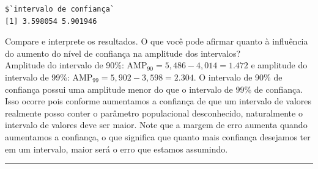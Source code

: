 \documentclass[a4paper,11pt,fleqn]{article}\usepackage[]{graphicx}\usepackage[]{color}
\makeatletter
\newenvironment{kframe}{%
 \def\at@end@of@kframe{}%
 \ifinner\ifhmode%
  \def\at@end@of@kframe{\end{minipage}}%
  \begin{minipage}{\columnwidth}%
 \fi\fi%
 \def\FrameCommand##1{\hskip\@totalleftmargin \hskip-\fboxsep
 \colorbox{shadecolor}{##1}\hskip-\fboxsep
     \hskip-\linewidth \hskip-\@totalleftmargin \hskip\columnwidth}%
 \MakeFramed {\advance\hsize-\width
   \@totalleftmargin\z@ \linewidth\hsize
   \@setminipage}}%
 {\par\unskip\endMakeFramed%
 \at@end@of@kframe}
\newenvironment{knitrout}{}{} %
\theoremstyle{definition}
\makeatother
\begin{document}
\begin{compactenum}[5.]
\begin{compactenum}
\begin{knitrout}
\begin{kframe}
\begin{verbatim}
$`intervalo de confiança`
[1] 3.598054 5.901946
\end{verbatim}
\end{kframe}
\end{knitrout}
  \item Compare e interprete os resultados. O que você pode afirmar
    quanto à influência do aumento do nível de confiança na amplitude
    dos intervalos? \\
Amplitude do intervalo de 90\%: $\text{AMP}_{90} = 5,486 - 4,014 =
1.472$ e amplitude do intervalo de 99\%:
$\text{AMP}_{99} = 5,902 - 3,598 = 2.304$. O intervalo
de 90\% de confiança possui uma amplitude menor do que o intervalo de
99\% de confiança. Isso ocorre pois conforme aumentamos a confiança de
que um intervalo de valores realmente posso conter o parâmetro
populacional desconhecido, naturalmente o intervalo de valores deve ser
maior. Note que a margem de erro aumenta quando aumentamos a confiança,
o que significa que quanto mais confiança desejamos ter em um intervalo,
maior será o erro que estamos assumindo.
  \end{compactenum}
\end{compactenum}



\vspace{0.3cm}
\hrule
\vspace{0.3cm}
\end{document}
